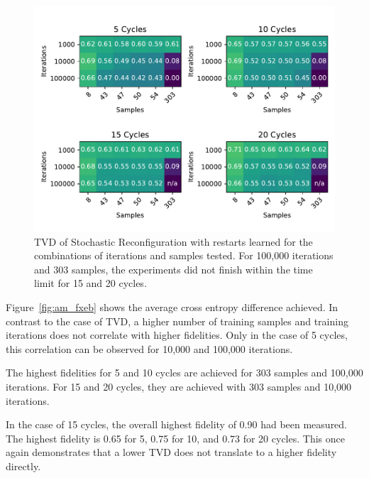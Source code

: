 \begin{figure}[H]
  \centering
  \includegraphics[width=\textwidth]{figures/results/AM-restarts-learned/tvd_heatmap.pdf}
  \caption[TVD of AdaMax with restarts learned]{TVD of Stochastic 
  Reconfiguration with restarts learned for the combinations of iterations and samples tested.
  For 100,000 iterations and 303 samples, the experiments did not finish within the time limit for 15 and 20 cycles.}
  \label{fig:am_tvd}
\end{figure}

Figure~\ref{fig:am_fxeb} shows the average cross entropy difference achieved. In contrast to the case 
of TVD, a higher number of training samples and training iterations does not correlate with higher 
fidelities. Only in the case of 5 cycles, this correlation can be observed for 10,000 and 100,000 iterations.

The highest fidelities for 5 and 10 cycles are achieved for 303 samples and 100,000 iterations. For 
15 and 20 cycles, they are achieved with 303 samples and 10,000 iterations. 

In the case of 15 cycles, the overall highest fidelity of 0.90 had been measured. The highest fidelity is 0.65 for 5, 0.75 for 10, and 0.73 for 20 cycles.
This once again demonstrates that a lower TVD does not translate to a higher fidelity directly.

